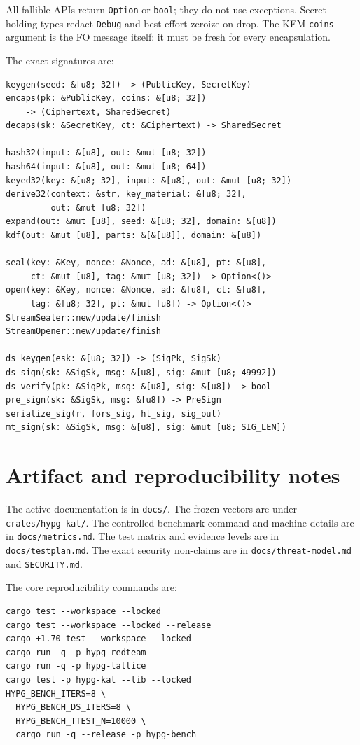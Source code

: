 \documentclass[runningheads]{llncs}
\begin{document}
All fallible APIs return \texttt{Option} or \texttt{bool}; they do not
use exceptions.  Secret-holding types redact \texttt{Debug} and
best-effort zeroize on drop.  The KEM \texttt{coins} argument is the FO
message itself: it must be fresh for every encapsulation.

The exact signatures are:

\begin{verbatim}
keygen(seed: &[u8; 32]) -> (PublicKey, SecretKey)
encaps(pk: &PublicKey, coins: &[u8; 32])
    -> (Ciphertext, SharedSecret)
decaps(sk: &SecretKey, ct: &Ciphertext) -> SharedSecret

hash32(input: &[u8], out: &mut [u8; 32])
hash64(input: &[u8], out: &mut [u8; 64])
keyed32(key: &[u8; 32], input: &[u8], out: &mut [u8; 32])
derive32(context: &str, key_material: &[u8; 32],
         out: &mut [u8; 32])
expand(out: &mut [u8], seed: &[u8; 32], domain: &[u8])
kdf(out: &mut [u8], parts: &[&[u8]], domain: &[u8])

seal(key: &Key, nonce: &Nonce, ad: &[u8], pt: &[u8],
     ct: &mut [u8], tag: &mut [u8; 32]) -> Option<()>
open(key: &Key, nonce: &Nonce, ad: &[u8], ct: &[u8],
     tag: &[u8; 32], pt: &mut [u8]) -> Option<()>
StreamSealer::new/update/finish
StreamOpener::new/update/finish

ds_keygen(esk: &[u8; 32]) -> (SigPk, SigSk)
ds_sign(sk: &SigSk, msg: &[u8], sig: &mut [u8; 49992])
ds_verify(pk: &SigPk, msg: &[u8], sig: &[u8]) -> bool
pre_sign(sk: &SigSk, msg: &[u8]) -> PreSign
serialize_sig(r, fors_sig, ht_sig, sig_out)
mt_sign(sk: &SigSk, msg: &[u8], sig: &mut [u8; SIG_LEN])
\end{verbatim}

\section{Artifact and reproducibility notes}
\label{app:artifact}

The active documentation is in \texttt{docs/}.  The frozen vectors are
under \texttt{crates/hypg-kat/}.  The controlled benchmark command and
machine details are in \texttt{docs/metrics.md}.  The test matrix and
evidence levels are in \texttt{docs/testplan.md}.  The exact security
non-claims are in \texttt{docs/threat-model.md} and
\texttt{SECURITY.md}.

The core reproducibility commands are:
\begin{verbatim}
cargo test --workspace --locked
cargo test --workspace --locked --release
cargo +1.70 test --workspace --locked
cargo run -q -p hypg-redteam
cargo run -q -p hypg-lattice
cargo test -p hypg-kat --lib --locked
HYPG_BENCH_ITERS=8 \
  HYPG_BENCH_DS_ITERS=8 \
  HYPG_BENCH_TTEST_N=10000 \
  cargo run -q --release -p hypg-bench
\end{verbatim}
\end{document}
